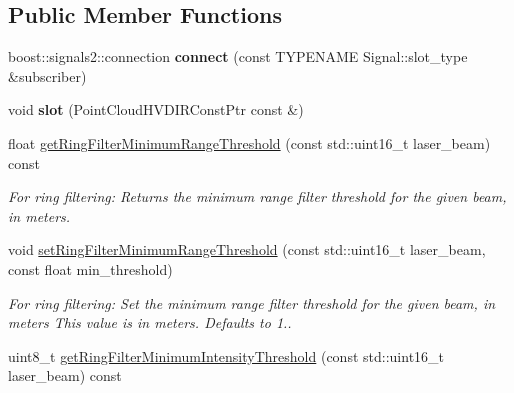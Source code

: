 \subsection*{Public Member Functions}
\begin{DoxyCompactItemize}
\item 
\hypertarget{structquanergy_1_1client_1_1RingIntensityFilter_af75a25cc369048128e88ad91578f624a}{boost\-::signals2\-::connection {\bfseries connect} (const T\-Y\-P\-E\-N\-A\-M\-E Signal\-::slot\-\_\-type \&subscriber)}\label{structquanergy_1_1client_1_1RingIntensityFilter_af75a25cc369048128e88ad91578f624a}

\item 
\hypertarget{structquanergy_1_1client_1_1RingIntensityFilter_afc344fd2d49bd478ddbd54115162b0ce}{void {\bfseries slot} (Point\-Cloud\-H\-V\-D\-I\-R\-Const\-Ptr const \&)}\label{structquanergy_1_1client_1_1RingIntensityFilter_afc344fd2d49bd478ddbd54115162b0ce}

\item 
\hypertarget{structquanergy_1_1client_1_1RingIntensityFilter_aafbba638a6d327081160ee286b2904e9}{float \hyperlink{structquanergy_1_1client_1_1RingIntensityFilter_aafbba638a6d327081160ee286b2904e9}{get\-Ring\-Filter\-Minimum\-Range\-Threshold} (const std\-::uint16\-\_\-t laser\-\_\-beam) const }\label{structquanergy_1_1client_1_1RingIntensityFilter_aafbba638a6d327081160ee286b2904e9}

\begin{DoxyCompactList}\small\item\em For ring filtering\-: Returns the minimum range filter threshold for the given beam, in meters. \end{DoxyCompactList}\item 
\hypertarget{structquanergy_1_1client_1_1RingIntensityFilter_ada863df252c1fa6d5179464acc515ae5}{void \hyperlink{structquanergy_1_1client_1_1RingIntensityFilter_ada863df252c1fa6d5179464acc515ae5}{set\-Ring\-Filter\-Minimum\-Range\-Threshold} (const std\-::uint16\-\_\-t laser\-\_\-beam, const float min\-\_\-threshold)}\label{structquanergy_1_1client_1_1RingIntensityFilter_ada863df252c1fa6d5179464acc515ae5}

\begin{DoxyCompactList}\small\item\em For ring filtering\-: Set the minimum range filter threshold for the given beam, in meters This value is in meters. Defaults to 1.. \end{DoxyCompactList}\item 
\hypertarget{structquanergy_1_1client_1_1RingIntensityFilter_ae872b5db1be0f7fdf068f23a01729a19}{uint8\-\_\-t \hyperlink{structquanergy_1_1client_1_1RingIntensityFilter_ae872b5db1be0f7fdf068f23a01729a19}{get\-Ring\-Filter\-Minimum\-Intensity\-Threshold} (const std\-::uint16\-\_\-t laser\-\_\-beam) const }\label{structquanergy_1_1client_1_1RingIntensityFilter_ae872b5db1be0f7fdf068f23a01729a19}


\end{DoxyCompactItemize}

